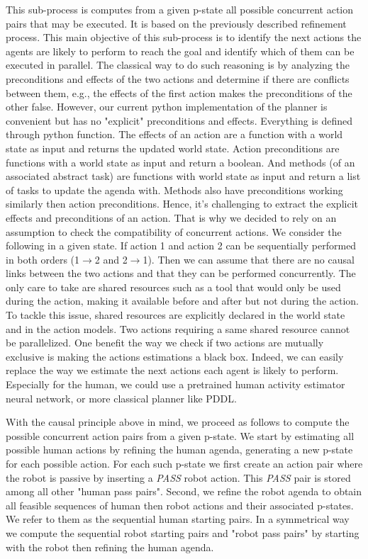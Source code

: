This sub-process is computes from a given p-state all possible concurrent action pairs that may be executed. It is based on the previously described refinement process. This main objective of this sub-process is to identify the next actions the agents are likely to perform to reach the goal and identify which of them can be executed in parallel. The classical way to do such reasoning is by analyzing the preconditions and effects of the two actions and determine if there are conflicts between them, e.g., the effects of the first action makes the preconditions of the other false.
However, our current python implementation of the planner is convenient but has no "explicit" preconditions and effects. Everything is defined through python function. The effects of an action are a function with a world state as input and returns the updated world state. Action preconditions are functions with a world state as input and return a boolean. And methods (of an associated abstract task) are functions with world state as input and return a list of tasks to update the agenda with. Methods also have preconditions working similarly then action preconditions. 
Hence, it's challenging to extract the explicit effects and preconditions of an action. That is why we decided to rely on an assumption to check the compatibility of concurrent actions. 
We consider the following in a given state. 
If action 1 and action 2 can be sequentially performed in both orders (1$\rightarrow$2 and 2$\rightarrow$1). Then we can assume that there are no causal links between the two actions and that they can be performed concurrently. The only care to take are shared resources such as a tool that would only be used during the action, making it available before and after but not during the action. To tackle this issue, shared resources are explicitly declared in the world state and in the action models. Two actions requiring a same shared resource cannot be parallelized.
One benefit the way we check if two actions are mutually exclusive is making the actions estimations a black box. Indeed, we can easily replace the way we estimate the next actions each agent is likely to perform. Especially for the human, we could use a pretrained human activity estimator neural network, or more classical planner like PDDL. 

With the causal principle above in mind, we proceed as follows to compute the possible concurrent action pairs from a given p-state. We start by estimating all possible human actions by refining the human agenda, generating a new p-state for each possible action. For each such p-state we first create an action pair where the robot is passive by inserting a \textit{PASS} robot action. This \textit{PASS} pair is stored among all other "human pass pairs". Second, we refine the robot agenda to obtain all feasible sequences of human then robot actions and their associated p-states. We refer to them as the sequential human starting pairs. In a symmetrical way we compute the sequential robot starting pairs and "robot pass pairs" by starting with the robot then refining the human agenda.

